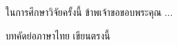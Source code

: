 \documentclass[a4paper,12pt]{upthesis}
\begin{document}
\newpage
\begin{acknowledgement}     %
\baselineskip=8mm
\setcounter{page}{2}

ในการศึกษาวิจัยครั้งนี้ ข้าพเจ้าขอขอบพระคุณ ...

\vspace{0.5cm}
\begin{flushright}
\makeauthor
\end{flushright}

\end{acknowledgement}


\renewcommand{\arraystretch}{1.1}


\newpage
\begin{abstractth}	%

บทคัดย่อภาษาไทย เขียนตรงนี้


\end{abstractth}
\end{document}
